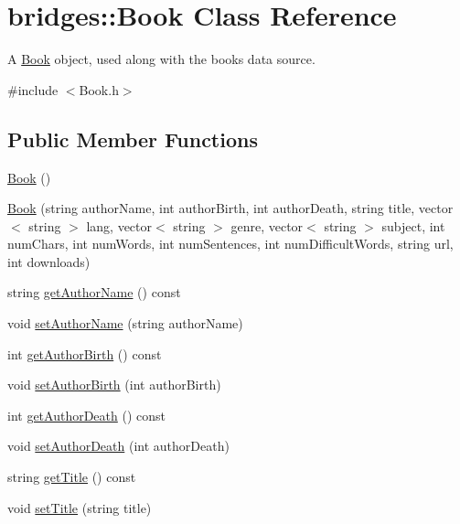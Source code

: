\hypertarget{classbridges_1_1_book}{}\section{bridges\+:\+:Book Class Reference}
\label{classbridges_1_1_book}


A \hyperlink{classbridges_1_1_book}{Book} object, used along with the books data source.  




{\ttfamily \#include $<$Book.\+h$>$}

\subsection*{Public Member Functions}
\begin{DoxyCompactItemize}
\item 
\hyperlink{classbridges_1_1_book_abb2903c640bd263a2e077d52e12a773e}{Book} ()
\item 
\hyperlink{classbridges_1_1_book_ac3060f3eaf757c82ea21f6501eb97b80}{Book} (string author\+Name, int author\+Birth, int author\+Death, string title, vector$<$ string $>$ lang, vector$<$ string $>$ genre, vector$<$ string $>$ subject, int num\+Chars, int num\+Words, int num\+Sentences, int num\+Difficult\+Words, string url, int downloads)
\item 
string \hyperlink{classbridges_1_1_book_ac6f0f8249f91502fe9dff0cbdb7d823a}{get\+Author\+Name} () const 
\item 
void \hyperlink{classbridges_1_1_book_affc38232dda1e6b04d7e38a02cdd9c39}{set\+Author\+Name} (string author\+Name)
\item 
int \hyperlink{classbridges_1_1_book_a027e0894b79bb778282ed44efccb78cc}{get\+Author\+Birth} () const 
\item 
void \hyperlink{classbridges_1_1_book_adca4d6766fa0068e23926ae95ed8411f}{set\+Author\+Birth} (int author\+Birth)
\item 
int \hyperlink{classbridges_1_1_book_ae53c1ee954d10e0409e4e8c16fe44035}{get\+Author\+Death} () const 
\item 
void \hyperlink{classbridges_1_1_book_a044ad1b1b6418d7545c6f957b2757bcd}{set\+Author\+Death} (int author\+Death)
\item 
string \hyperlink{classbridges_1_1_book_a06296dbad347d4c81feed3faa8fc1114}{get\+Title} () const 
\item 
void \hyperlink{classbridges_1_1_book_a277540665913ac1a4a943af99dad46bb}{set\+Title} (string title)

\end{DoxyCompactItemize}

